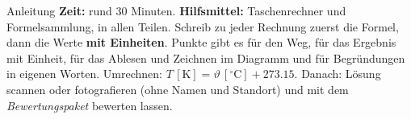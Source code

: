 \documentclass[11pt]{article}
\begin{document}

\begin{lpinfo}{Anleitung}
\textbf{Zeit:} rund 30 Minuten. \textbf{Hilfsmittel:} Taschenrechner und Formelsammlung, in allen Teilen.
Schreib zu jeder Rechnung zuerst die Formel, dann die Werte \textbf{mit Einheiten}. Punkte gibt es für den Weg,
für das Ergebnis mit Einheit, für das Ablesen und Zeichnen im Diagramm und für Begründungen in eigenen Worten.
Umrechnen: $T\,[\text{K}] = \vartheta\,[^\circ\text{C}] + 273.15$.
Danach: Lösung scannen oder fotografieren (ohne Namen und Standort) und mit dem \emph{Bewertungspaket} bewerten lassen.
\end{lpinfo}

\end{document}
